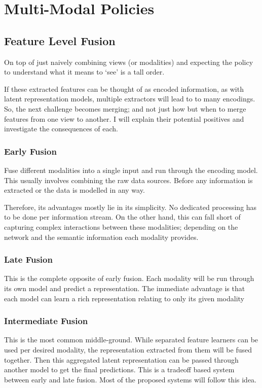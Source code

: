 \section{Multi-Modal Policies}\label{sec:multi-modal-policies}

\subsection{Feature Level Fusion}
On top of just naively combining views (or modalities) and expecting the policy to understand what it means to `see' is a tall order. 

If these extracted features can be thought of as encoded information, as with latent representation models, multiple extractors will lead to to many encodings. So, the next challenge becomes merging; and not just how but when to merge features from one view to another. I will explain their potential positives and investigate the consequences of each.

\subsubsection{Early Fusion}
Fuse different modalities into a single input and run through the encoding model. This usually involves combining the raw data sources. Before any information is extracted or the data is modelled in any way.

Therefore, its advantages mostly lie in its simplicity. No dedicated processing has to be done per information stream. On the other hand, this can fall short of capturing complex interactions between these modalities; depending on the network and the semantic information each modality provides.

\subsubsection{Late Fusion}
This is the complete opposite of early fusion. Each modality will be run through its own model and predict a representation. The immediate advantage is that each model can learn a rich representation relating to only its given modality

\subsubsection{Intermediate Fusion}
This is the most common middle-ground. While separated feature learners can be used per desired modality, the representation extracted from them will be fused together. Then this aggregated latent representation can be passed through another model to get the final predictions. This is a tradeoff based system between early and late fusion. Most of the proposed systems will follow this idea.

